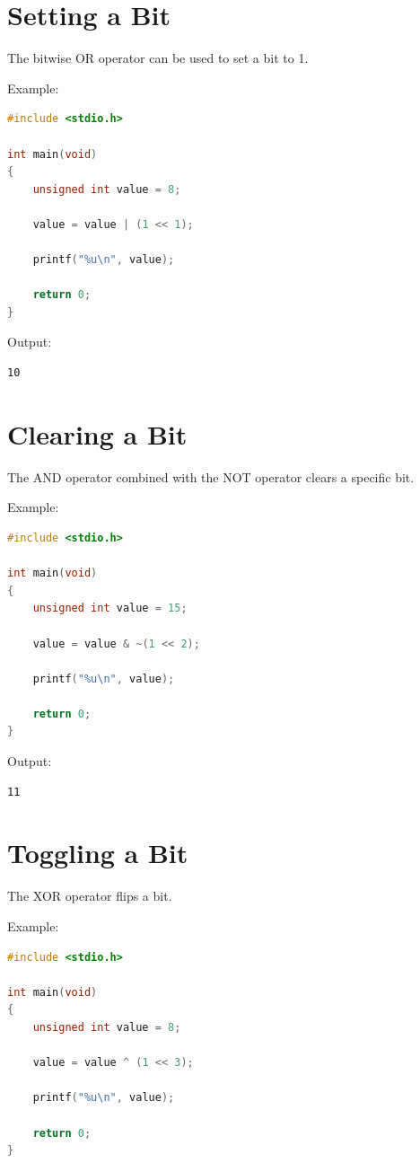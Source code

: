 \documentclass[12pt,openany]{book}
\begin{document}
\section{Setting a Bit}

The bitwise OR operator can be used to set a bit to 1.

Example:

\begin{lstlisting}[language=C]
#include <stdio.h>

int main(void)
{
    unsigned int value = 8;

    value = value | (1 << 1);

    printf("%u\n", value);

    return 0;
}
\end{lstlisting}

Output:

\begin{lstlisting}
10
\end{lstlisting}

\section{Clearing a Bit}

The AND operator combined with the NOT operator clears a specific bit.

Example:

\begin{lstlisting}[language=C]
#include <stdio.h>

int main(void)
{
    unsigned int value = 15;

    value = value & ~(1 << 2);

    printf("%u\n", value);

    return 0;
}
\end{lstlisting}

Output:

\begin{lstlisting}
11
\end{lstlisting}

\section{Toggling a Bit}

The XOR operator flips a bit.

Example:

\begin{lstlisting}[language=C]
#include <stdio.h>

int main(void)
{
    unsigned int value = 8;

    value = value ^ (1 << 3);

    printf("%u\n", value);

    return 0;
}
\end{lstlisting}
\end{document}
